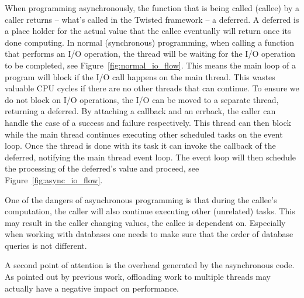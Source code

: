 When programming asynchronously, the function that is being called (callee) by a caller returns -- what's called in the Twisted framework -- a deferred.
A deferred is a place holder for the actual value that the callee eventually will return once its done computing.
In normal (synchronous) programming, when calling a function that performs an I/O operation, the thread will be waiting for the I/O operation to be completed, see Figure~\ref{fig:normal_io_flow}.
This means the main loop of a program will block if the I/O call happens on the main thread.
This wastes valuable CPU cycles if there are no other threads that can continue.
To ensure we do not block on I/O operations, the I/O can be moved to a separate thread, returning a deferred.
By attaching a callback and an errback, the caller can handle the case of a success and failure respectively.
This thread can then block while the main thread continues executing other scheduled tasks on the event loop.
Once the thread is done with its task it can invoke the callback of the deferred, notifying the main thread event loop.
The event loop will then schedule the processing of the deferred's value and proceed, see Figure~\ref{fig:async_io_flow}.

One of the dangers of asynchronous programming is that during the callee's computation, the caller will also continue executing other (unrelated) tasks.
This may result in the caller changing values, the callee is dependent on.
Especially when working with databases one needs to make sure that the order of database queries is not different.

A second point of attention is the overhead generated by the asynchronous code.
As pointed out by previous work, offloading work to multiple threads may actually have a negative impact on performance.